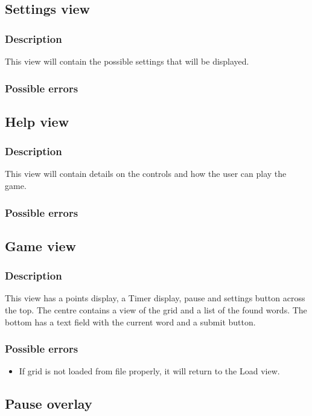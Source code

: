 \documentclass{project}
\begin{document}
\subsection{Settings view} \label{Settings View}
\subsubsection{Description}
This view will contain the possible settings that will be displayed.
\subsubsection{Possible errors}

\subsection{Help view} \label{Help View}
\subsubsection{Description}
This view will contain details on the controls and how the user can play the game.
\subsubsection{Possible errors}

\subsection{Game view} \label{Game View}
\subsubsection{Description}
This view has a points display, a Timer display, pause and settings button across the top. The centre contains a view of the grid and a list of the found words. The bottom has a text field with the current word and a submit button.
\subsubsection{Possible errors}
\begin{itemize}
\item If grid is not loaded from file properly, it will return to the Load view.
\end{itemize}

\subsection{Pause overlay} \label{Pause Overlay}
\end{document}
